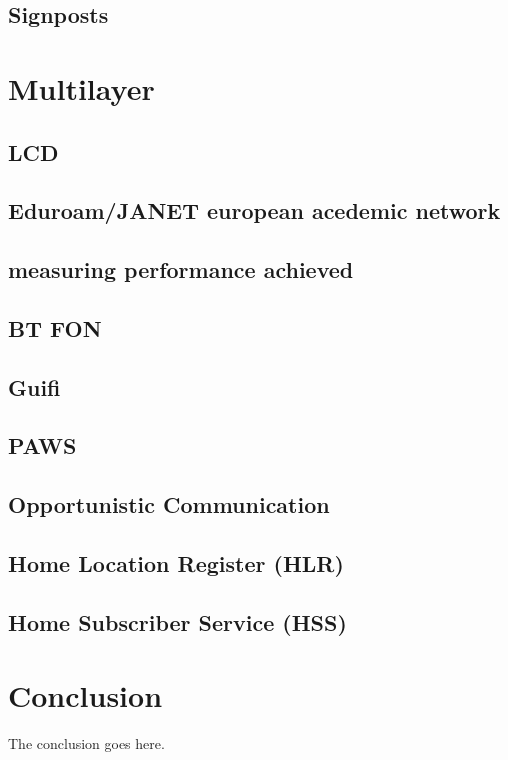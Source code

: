 \documentclass[journal]{IEEEtran}
\begin{document}
\subsection{ Signposts }

\section{Multilayer}
\subsection{ LCD }
\subsection{ Eduroam/JANET european acedemic network }
\subsection{ measuring performance achieved }
\subsection{ BT FON }
\subsection{ Guifi }
\subsection{ PAWS }
\subsection{ Opportunistic Communication }
\subsection{ Home Location Register (HLR) }
\subsection{ Home Subscriber Service (HSS) }

\section{Conclusion}
The conclusion goes here.


\end{document}
